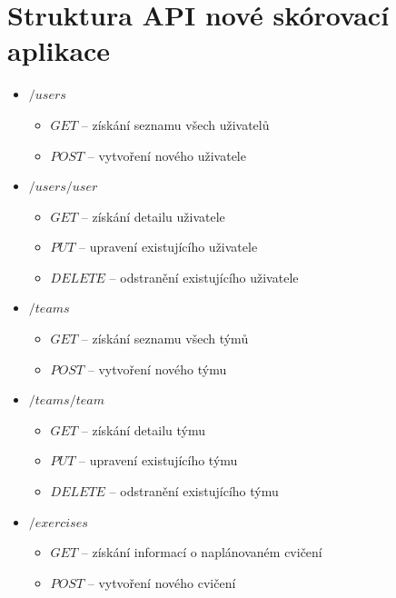 \documentclass[
  digital,
  twoside,
  table, 
  nolof, 
  nolot
]{fithesis3}
\begin{document}
\printbibliography[heading=bibintoc] %

\appendix %
\chapter{Struktura API nové skórovací aplikace}
\label{appendAPI}

\renewcommand\labelitemii{$\square$}
\begin{itemize}
    \item $/users$
    \begin{itemize}
        \item $GET$ -- získání seznamu všech uživatelů
        \item $POST$ --  vytvoření nového uživatele
    \end{itemize}
    
    \item $/users/{user}$
    \begin{itemize}
        \item $GET$ -- získání detailu uživatele
        \item $PUT$ -- upravení existujícího uživatele
        \item $DELETE$ -- odstranění existujícího uživatele
    \end{itemize}
    
    \item $/teams$
    \begin{itemize}
        \item $GET$ -- získání seznamu všech týmů
        \item $POST$ --  vytvoření nového týmu
    \end{itemize}
    
    \item $/teams/{team}$
    \begin{itemize}
        \item $GET$ -- získání detailu týmu
        \item $PUT$ -- upravení existujícího týmu
        \item $DELETE$ -- odstranění existujícího týmu
    \end{itemize}
    
    \item $/exercises$
    \begin{itemize}
        \item $GET$ -- získání informací o naplánovaném cvičení
        \item $POST$ -- vytvoření nového cvičení
    \end{itemize}
    

\end{itemize}
\end{document}
